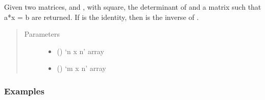 \documentclass[letterpaper,10pt,english]{sphinxmanual}
\begin{document}
\begin{fulllineitems}
Given two matrices,  and , with  square, the determinant
of  and a matrix  such that a*x = b are returned.
If  is the identity, then  is the inverse of .
\begin{quote}\begin{description}
\item[{Parameters}] \leavevmode\begin{itemize}
\item {} 
 () \textendash{} ‘n x n’ array

\item {} 
 () \textendash{} ‘m x n’ array

\end{itemize}

\end{description}\end{quote}
\subsubsection*{Examples}


\end{fulllineitems}
\end{document}

